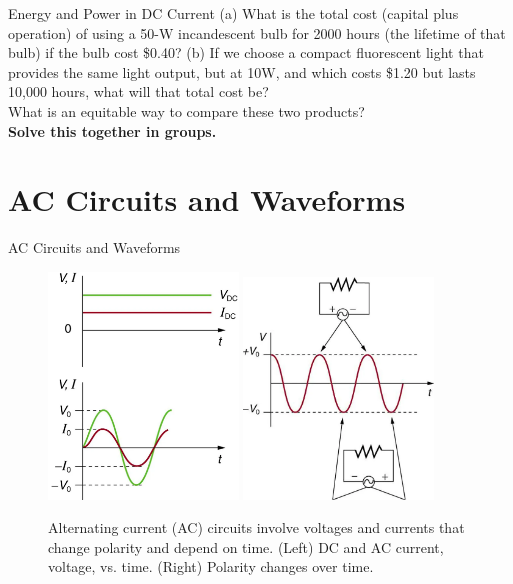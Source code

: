 \documentclass{beamer}
\begin{document}
\begin{frame}{Energy and Power in DC Current}
(a) What is the total cost (capital plus operation) of using a 50-W incandescent bulb for 2000 hours (the lifetime of that bulb) if the bulb cost \$0.40? (b) If we choose a compact fluorescent light that provides the same light output, but at 10W, and which costs \$1.20 but lasts 10,000 hours, what will that total cost be? \\ \vspace{0.5cm}
What is an equitable way to compare these two products? \\ \vspace{0.5cm}
\textbf{\alert{Solve this together in groups.}}
\end{frame}

\section{AC Circuits and Waveforms}

\begin{frame}{AC Circuits and Waveforms}
\begin{figure}
\centering
\includegraphics[width=0.45\textwidth]{figures/AC_1.png}
\includegraphics[width=0.45\textwidth]{figures/AC_2.png}
\caption{\label{fig:ac_1} Alternating current (AC) circuits involve voltages and currents that change polarity and depend on time. (Left) DC and AC current, voltage, vs. time.  (Right) Polarity changes over time.}
\end{figure}
\end{frame}
\end{document}

